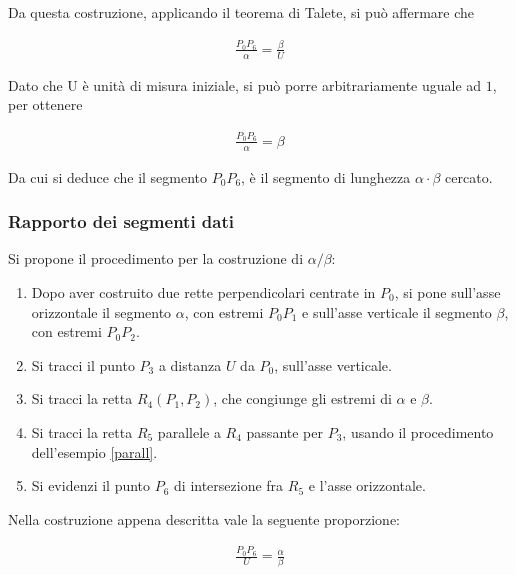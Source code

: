 Da questa costruzione, applicando il teorema di Talete, si può affermare che

\begin{align*}
\frac{P_{0}P_{6}}{\alpha} = \frac{\beta}{U}
\end{align*}

Dato che U è unità di misura iniziale, si può porre arbitrariamente uguale ad $1$, per ottenere

\begin{align*}
\frac{P_{0}P_{6}}{\alpha} = \beta
\end{align*}

Da cui si deduce che il segmento $P_{0}P_{6}$, è il segmento di lunghezza $\alpha \cdot \beta$ cercato. \\ 


\subsubsection{Rapporto dei segmenti dati}
Si propone il procedimento per la costruzione di $\alpha/\beta$:

\begin{enumerate}

\item Dopo aver costruito due rette perpendicolari centrate in $P_{0}$, si pone sull'asse orizzontale il segmento $\alpha$, con estremi $P_{0} P_{1}$ e sull'asse verticale il segmento $\beta$, con estremi $P_{0} P_{2}$.

\item Si tracci il punto $P_{3}$ a distanza $U$ da $P_{0}$, sull'asse verticale.

\item Si tracci la retta $R_{4}(P_{1}, P_{2})$, che congiunge gli estremi di $\alpha$ e $\beta$.

\item Si tracci la retta $R_{5}$ parallele a $R_{4}$ passante per $P_{3}$, usando il procedimento dell'esempio \ref{parall}.

\item Si evidenzi il punto $P_{6}$ di intersezione fra $R_{5}$ e l'asse orizzontale.

\end{enumerate}

Nella costruzione appena descritta vale la seguente proporzione:

\begin{align*}
\frac{P_{0}P_{6}}{U} = \frac{\alpha}{\beta}
\end{align*}


